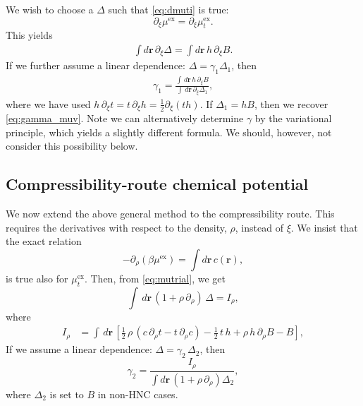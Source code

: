\documentclass[aip,jcp,reprint,superscriptaddress]{revtex4-1}
\newcommand{\vct}[1]{\mathbf{#1}}
\providecommand{\vr}{} %
\renewcommand{\vr}{\vct{r}}
\newcommand{\supex}[1]{ { { #1 }^{ \mathrm{ex} } } }
\newcommand{\muex}{\supex{\mu}}
\newcommand{\mutex}{\mu^{ \mathrm{ex} }_t}
\begin{document}
We wish to choose a $\Delta$ such that \eqref{eq:dmuti} is true:
%
\[
  \partial_\xi \muex =  \partial_\xi \mutex.
\]
%
This yields
\begin{align}
  \int d\vr \, \partial_\xi \Delta
=
  \int d\vr \, h \, \partial_\xi B.
  \label{eq:corr_muv}
\end{align}
%
If we further assume a linear dependence: $\Delta = \gamma_1 \Delta_1$,
then
\begin{align}
  \gamma_1
=
  \frac
  {
    \int \, d\vr \, h \, \partial_\xi B
  }
  {
    \int \, d\vr \, \partial_\xi \Delta_1
  },
  \label{eq:gamma_virial}
\end{align}
%
where we have used $h \, \partial_\xi t = t \, \partial_\xi h = \frac{1}{2} \partial_\xi (t h)$.
%
If $\Delta_1 = h B$, then we recover \eqref{eq:gamma_muv}.
%
Note we can alternatively determine $\gamma$ by the variational principle,
which yields a slightly different formula.
%
We should, however, not consider this possibility below.



\subsection{Compressibility-route chemical potential}

We now extend the above general method to the compressibility route.
%
This requires the derivatives with respect to the density, $\rho$,
instead of $\xi$.
%
We insist that the exact relation
\begin{equation}
  -\partial_\rho (\beta \muex) = \int d\vr \, c(\vr),
  \label{eq:mu_compr}
\end{equation}
is true also for $\mutex$.
%
Then, from \eqref{eq:mutrial}, we get
%
\begin{equation}
  \int \, d\vr \, (1 + \rho \, \partial_\rho) \, \Delta
=
  I_\rho,
  \label{eq:corr_muc}
\end{equation}
%
where
\begin{align*}
I_\rho
&=
\int \, d\vr \,
  \left[
  \frac{1}{2} \, \rho \, (c \, \partial_\rho t - t \, \partial_\rho c)
- \frac{1}{2} \, t \, h
+ \rho \, h \, \partial_\rho B
- B
  \right],
\end{align*}
%
If we assume a linear dependence:
%
$\Delta = \gamma_2 \, \Delta_2$,
then
\begin{equation}
  \gamma_2
=
  \frac
  {
    I_\rho
  }
  {
    \int d\vr \, (1 + \rho \, \partial_\rho) \Delta_2
  },
  \label{eq:gamma_muc}
\end{equation}
where $\Delta_2$ is set to $B$ in non-HNC cases.
\end{document}

